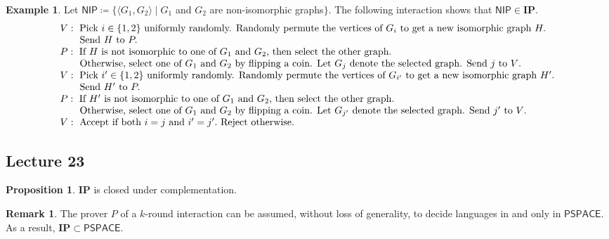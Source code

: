 \documentclass[10pt,letterpaper,cm]{nupset}
\theoremstyle{definition}
\newtheorem{exmp}{Example}
\newtheorem{remark}{Remark}
\newtheorem{prop}{Proposition}
\newcommand{\1}{\mathbf{1}}
\newcommand{\0}{\vec 0}
\begin{document}
\begin{exmp}
Let $\mathsf{NIP}\coloneqq \{ \langle G_1, G_2 \rangle \mid G_1$ and $G_2$ are non-isomorphic graphs$\}$. The following interaction shows that $\mathsf{NIP} \in \mathbf{IP}$.
\[
\begin{array}{l}{V : \text { Pick } i \in\{1,2\} \text { uniformly randomly. Randomly permute the vertices of } G_{i} \text { to get a  new isomorphic graph } H .} \\ {\text {\quad \quad Send } H \text { to } P .} \\ {P : \text { If } H \text { is not isomorphic to one of } G_1 \text{ and } G_2 \text {, then select the other graph. }} \\ {
\text {\quad \quad Otherwise, select one of } G_1 \text{ and } G_2 \text { by flipping a coin. Let } G_j \text{ denote the selected graph. Send } j \text { to } V \text {. }} \\
{V : \text { Pick } i' \in\{1,2\} \text { uniformly randomly. Randomly permute the vertices of } G_{i'} \text { to get a new isomorphic graph } H' .} \\ { \text {\quad \quad Send } H' \text { to } P .} \\ {P : \text { If } H' \text { is not isomorphic to one of } G_1 \text{ and } G_2 \text {, then select the other graph. }} \\ {
\text {\quad \quad Otherwise, select one of } G_1 \text{ and } G_2 \text { by flipping a coin. Let } G_{j'} \text{ denote the selected graph. Send } j' \text { to } V \text {. }}
\\ {V : \text { Accept if both } i=j \text{ and } i' =j'. \text { Reject otherwise. }}\end{array}
\] 
\end{exmp}

\subsection{Lecture 23}

\begin{prop}
$\mathbf{IP}$ is closed under complementation. 
\end{prop}

\begin{remark}
The prover $P$ of a $k$-round interaction can be assumed, without loss of generality, to decide languages in and only in $\mathsf{PSPACE}$. As a result, $\mathbf{IP} \subset \mathsf{PSPACE}$.
\end{remark}
\end{document}
